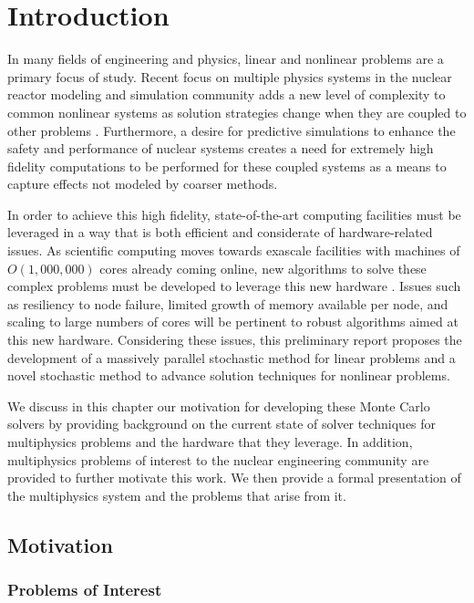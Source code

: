 \chapter{Introduction}
\label{ch:introduction}
In many fields of engineering and physics, linear and nonlinear
problems are a primary focus of study. Recent focus on multiple
physics systems in the nuclear reactor modeling and simulation
community adds a new level of complexity to common nonlinear systems
as solution strategies change when they are coupled to other problems
\citep{u.s._department_of_energy_casl:_2011}. Furthermore, a desire
for predictive simulations to enhance the safety and performance of
nuclear systems creates a need for extremely high fidelity
computations to be performed for these coupled systems as a means to
capture effects not modeled by coarser methods.

In order to achieve this high fidelity, state-of-the-art computing
facilities must be leveraged in a way that is both efficient and
considerate of hardware-related issues. As scientific computing moves
towards exascale facilities with machines of $O(1,000,000)$ cores
already coming online, new algorithms to solve these complex problems
must be developed to leverage this new hardware
\citep{kogge_using_2011}. Issues such as resiliency to node failure,
limited growth of memory available per node, and scaling to large
numbers of cores will be pertinent to robust algorithms aimed at this
new hardware. Considering these issues, this preliminary report
proposes the development of a massively parallel stochastic method for
linear problems and a novel stochastic method to advance solution
techniques for nonlinear problems.

We discuss in this chapter our motivation for developing these Monte
Carlo solvers by providing background on the current state of solver
techniques for multiphysics problems and the hardware that they
leverage. In addition, multiphysics problems of interest to the
nuclear engineering community are provided to further motivate this
work. We then provide a formal presentation of the multiphysics system
and the problems that arise from it.

\section{Motivation}
\label{sec:motivation}

\subsection{Problems of Interest}
\label{subsec:problems of interest}

